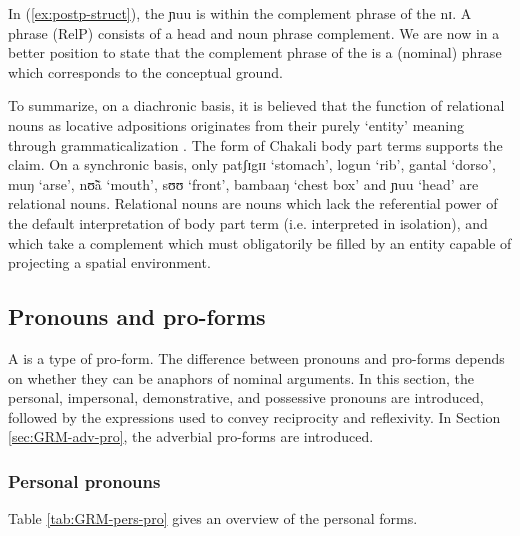 \begin{exe}
\begin{exe}
\begin{exe}
\begin{exe}
\begin{exe}
\begin{exe}
\begin{exe}
\begin{exe}
In (\ref{ex:postp-struct}), the  {\sls ɲuu} is within the complement phrase of the  {\sls nɪ}.  A  phrase (RelP) consists of a head  and noun phrase complement.  We are now in a  better position to state that the complement phrase of the  is a (nominal) phrase which corresponds to the conceptual ground. 

To summarize, on a diachronic basis, it is believed that the function of relational nouns  as locative adpositions originates from their purely `entity' meaning through grammaticalization \citep[44, 83]{Hein84}. The form of Chakali body part terms supports the claim.   On a synchronic basis, only  {\sls patʃɪgɪɪ} `stomach',  {\sls logun } `rib',  {\sls gantal} `dorso', {\sls muŋ}   `arse', {\sls nʊ̃ã} `mouth',  {\sls sʊʊ} `front', {\sls bambaaŋ} `chest box'  and {\sls ɲuu} `head' are relational nouns. Relational nouns are  nouns which lack the referential power of the default interpretation of  body part term  (i.e. interpreted in  isolation), and which take a complement which must obligatorily be filled by an entity capable of projecting a spatial environment.



\subsection{Pronouns and pro-forms}
\label{sec:GRM-pronouns}

 A  is a type of pro-form.  The difference between pronouns and pro-forms depends on whether they can be anaphors of nominal arguments. In this section, the personal, impersonal, demonstrative, and possessive pronouns are introduced, followed by the expressions used to convey reciprocity and reflexivity.   In Section \ref{sec:GRM-adv-pro},  the adverbial pro-forms are  introduced.

\largerpage[-1]
\subsubsection{Personal pronouns}
\label{sec:GRM-personal-pronouns}

Table \ref{tab:GRM-pers-pro} gives an overview of the personal  forms.


\end{exe}
\end{exe}
\end{exe}
\end{exe}
\end{exe}
\end{exe}
\end{exe}
\end{exe}
